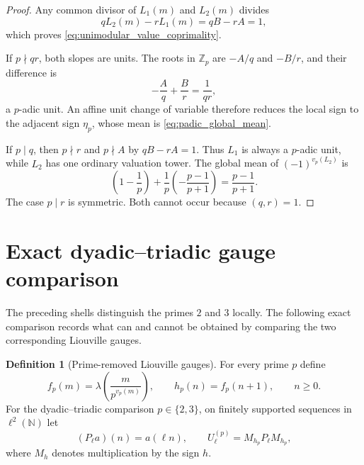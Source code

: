 \documentclass[11pt]{amsart}
\numberwithin{equation}{section}
\theoremstyle{plain}
\theoremstyle{definition}
\newtheorem{definition}[theorem]{Definition}
\theoremstyle{remark}
\newcommand{\N}{\mathbb N}
\newcommand{\Z}{\mathbb Z}
\newcommand{\liou}{\lambda}
\begin{document}
\begin{proof}
Any common divisor of $L_1(m)$ and $L_2(m)$ divides
\begin{equation}
qL_2(m)-rL_1(m)=qB-rA=1,
\label{eq:determinant_bezout}
\end{equation}
which proves \eqref{eq:unimodular_value_coprimality}.

If $p\nmid qr$, both slopes are units.  The roots in $\Z_p$ are $-A/q$ and $-B/r$, and their difference is
\begin{equation}
-\frac Aq+\frac Br=\frac1{qr},
\label{eq:root_difference_unit}
\end{equation}
a $p$-adic unit.  An affine unit change of variable therefore reduces the local sign to the adjacent sign $\eta_p$, whose mean is \eqref{eq:padic_global_mean}.

If $p\mid q$, then $p\nmid r$ and $p\nmid A$ by $qB-rA=1$.  Thus $L_1$ is always a $p$-adic unit, while $L_2$ has one ordinary valuation tower.  The global mean of $(-1)^{v_p(L_2)}$ is
\begin{equation}
\left(1-\frac1p\right)
+\frac1p\left(-\frac{p-1}{p+1}\right)
=\frac{p-1}{p+1}.
\label{eq:single_tower_mean}
\end{equation}
The case $p\mid r$ is symmetric.  Both cannot occur because $(q,r)=1$.
\end{proof}


\section{Exact dyadic--triadic gauge comparison}
\label{sec:dyadic_triadic_gauges}

The preceding shells distinguish the primes $2$ and $3$ locally.  The following exact comparison records what can and cannot be obtained by comparing the two corresponding Liouville gauges.

\begin{definition}[Prime-removed Liouville gauges]
\label{def:prime_removed_gauges}
For every prime $p$ define
\begin{equation}
f_p(m)=\liou\!\left(\frac{m}{p^{v_p(m)}}\right),
\qquad
h_p(n)=f_p(n+1),
\qquad n\ge0.
\label{eq:fp_hp_definition}
\end{equation}
For the dyadic--triadic comparison $p\in\{2,3\}$, on finitely supported sequences in $\ell^2(\N)$ let
\begin{equation}
(P_\ell a)(n)=a(\ell n),
\qquad
U_\ell^{(p)}=M_{h_p}P_\ell M_{h_p},
\label{eq:gauge_operator_definition}
\end{equation}
where $M_h$ denotes multiplication by the sign $h$.
\end{definition}
\end{document}
